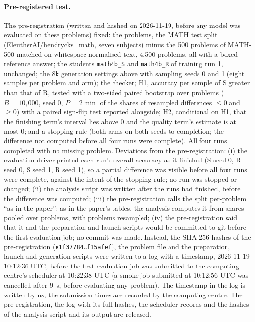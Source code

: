 \documentclass[10pt]{article}
\begin{document}
\paragraph{Pre-registered test.} The pre-registration (written and hashed on 2026-11-19, before any model was evaluated on these problems) fixed: the problems, the MATH test split (EleutherAI/hendrycks\_math, seven subjects) minus the 500 problems of MATH-500 matched on whitespace-normalised text, 4{,}500 problems, all with a boxed reference answer; the students \texttt{math4b\_S} and \texttt{math4b\_R} of training run 1, unchanged; the 8k generation settings above with sampling seeds 0 and 1 (eight samples per problem and arm); the checker; H1, accuracy per sample of S greater than that of R, tested with a two-sided paired bootstrap over problems ($B=10{,}000$, seed 0, $P=2\min$ of the shares of resampled differences $\le0$ and $\ge0$) with a paired sign-flip test reported alongside; H2, conditional on H1, that the finishing term's interval lies above 0 and the quality term's estimate is at most 0; and a stopping rule (both arms on both seeds to completion; the difference not computed before all four runs were complete). All four runs completed with no missing problem. Deviations from the pre-registration: (i) the evaluation driver printed each run's overall accuracy as it finished (S seed 0, R seed 0, S seed 1, R seed 1), so a partial difference was visible before all four runs were complete, against the intent of the stopping rule; no run was stopped or changed; (ii) the analysis script was written after the runs had finished, before the difference was computed; (iii) the pre-registration calls the split per-problem ``as in the paper''; as in the paper's tables, the analysis computes it from shares pooled over problems, with problems resampled; (iv) the pre-registration said that it and the preparation and launch scripts would be committed to git before the first evaluation job; no commit was made. Instead, the SHA-256 hashes of the pre-registration (\texttt{e1f37784\ldots f15afef}), the problem file and the preparation, launch and generation scripts were written to a log with a timestamp, 2026-11-19 10:12:36 UTC, before the first evaluation job was submitted to the computing centre's scheduler at 10:22:38 UTC (a smoke job submitted at 10:12:56 UTC was cancelled after 9~s, before evaluating any problem). The timestamp in the log is written by us; the submission times are recorded by the computing centre. The pre-registration, the log with its full hashes, the scheduler records and the hashes of the analysis script and its output are released.
\end{document}
